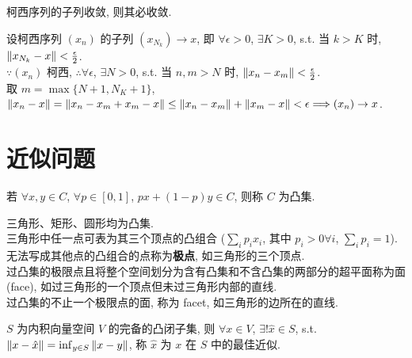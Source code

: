 \documentclass{note}
\begin{document}
\begin{cor}\label{cor-13.1}
    柯西序列的子列收敛, 则其必收敛.
\end{cor}
\begin{pf}
    设柯西序列 $(x_n)$ 的子列 $(x_{N_k})\rightarrow x$, 即 $\forall\epsilon>0$, $\exists K>0$, s.t. 当 $k>K$ 时, $\left\lVert x_{N_k}-x\right\rVert<\frac{\epsilon}{2}$.\\
    $\because(x_n)$ 柯西, $\therefore\forall\epsilon$, $\exists N>0$, s.t. 当 $n,m>N$ 时, $\left\lVert x_n-x_m\right\rVert<\frac{\epsilon}{2}$.\\
    取 $m=\max\{N+1,N_K+1\}$, $\left\lVert x_n-x\right\rVert=\left\lVert x_n-x_m+x_m-x\right\rVert\leq\left\lVert x_n-x_m\right\rVert+\left\lVert x_m-x\right\rVert<\epsilon\Longrightarrow(x_n)\rightarrow x$.
\end{pf}

\section{近似问题}
\begin{df}[凸集]
    若 $\forall x,y\in C$, $\forall p\in[0,1]$, $px+(1-p)y\in C$, 则称 $C$ 为凸集.
\end{df}
\begin{eg}
    三角形、矩形、圆形均为凸集.\\
    三角形中任一点可表为其三个顶点的凸组合 ($\sum_ip_ix_i$, 其中 $p_i>0\forall i$, $\sum_ip_i=1$).\\
    无法写成其他点的凸组合的点称为\textbf{极点}, 如三角形的三个顶点.\\
    过凸集的极限点且将整个空间划分为含有凸集和不含凸集的两部分的超平面称为面 (face), 如过三角形的一个顶点但未过三角形内部的直线.\\
    过凸集的不止一个极限点的面, 称为 facet, 如三角形的边所在的直线.
\end{eg}

\begin{thm}[(课本定理 13.9)]
    $S$ 为内积向量空间 $V$ 的完备的凸闭子集, 则 $\forall x\in V$, $\exists!\hat{x}\in S$, s.t. $\left\lVert x-\hat{x}\right\rVert=\inf_{y\in S}\left\lVert x-y\right\rVert$, 称 $\hat{x}$ 为 $x$ 在 $S$ 中的最佳近似.
\end{thm}
\ifx\allfiles\undefined
\end{document}
